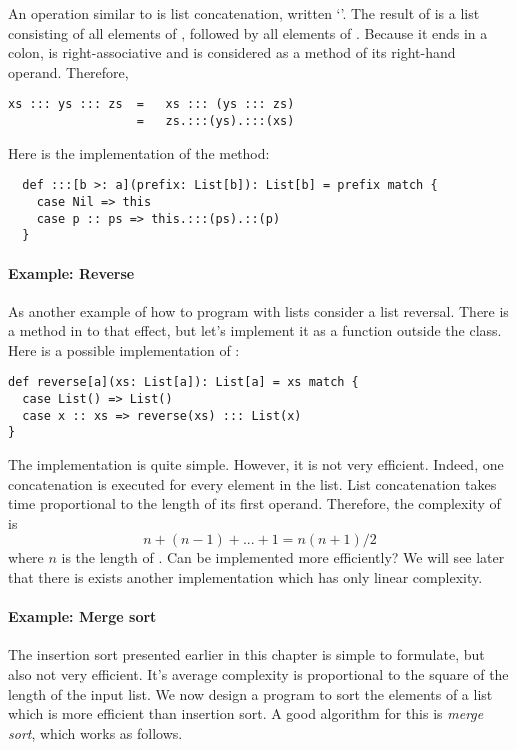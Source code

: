 \documentclass[a4paper,12pt,twoside,titlepage]{book}
\begin{document}
An operation similar to \code{::} is list concatenation, written
`\code{:::}'. The result of  is a list consisting of
all elements of , followed by all elements of .
Because it ends in a colon, \code{:::} is right-associative and is
considered as a method of its right-hand operand. Therefore,
\begin{lstlisting}
xs ::: ys ::: zs  =   xs ::: (ys ::: zs)
                  =   zs.:::(ys).:::(xs)
\end{lstlisting}
Here is the implementation of the \code{:::} method:
\begin{lstlisting}
  def :::[b >: a](prefix: List[b]): List[b] = prefix match {
    case Nil => this
    case p :: ps => this.:::(ps).::(p)
  }
\end{lstlisting}

\paragraph{Example: Reverse} As another example of how to program with
lists consider a list reversal. There is a method  in
 to that effect, but let's implement it as a function
outside the class. Here is a possible implementation of
:
\begin{lstlisting}
def reverse[a](xs: List[a]): List[a] = xs match {
  case List() => List()
  case x :: xs => reverse(xs) ::: List(x)
}
\end{lstlisting}
The implementation is quite simple. However, it is not very efficient.
Indeed, one concatenation is executed for every element in the
list. List concatenation takes time proportional to the length
of its first operand. Therefore, the complexity of  is 
\[
n + (n - 1) + ... + 1 = n(n+1)/2
\]
where $n$ is the length of . Can  be
implemented more efficiently? We will see later that there is exists
another implementation which has only linear complexity.

\paragraph{Example: Merge sort}
The insertion sort presented earlier in this chapter is simple to
formulate, but also not very efficient. It's average complexity is
proportional to the square of the length of the input list. We now
design a program to sort the elements of a list which is more
efficient than insertion sort. A good algorithm for this is {\em merge
sort}, which works as follows.
\end{document}
